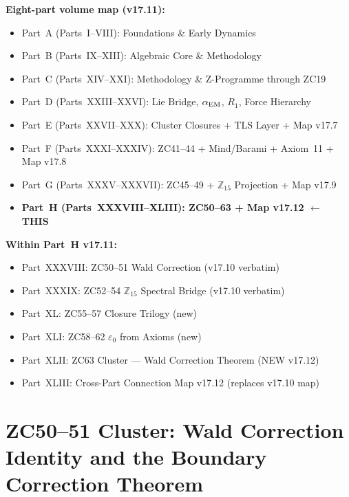 \documentclass[12pt, a4paper]{article}
\begin{document}
\begin{contentsbox}[title={Part H v17.11 --- Position in the Complete Edition}]
\textbf{Eight-part volume map (v17.11):}
\begin{itemize}[leftmargin=1.5em]
\item Part~A (Parts~I--VIII): Foundations \& Early Dynamics
\item Part~B (Parts~IX--XIII): Algebraic Core \& Methodology
\item Part~C (Parts~XIV--XXI): Methodology \& Z-Programme through ZC19
\item Part~D (Parts~XXIII--XXVI): Lie Bridge, $\alpha_{\rm EM}$, $R_1$, Force Hierarchy
\item Part~E (Parts~XXVII--XXX): Cluster Closures + TLS Layer + Map v17.7
\item Part~F (Parts~XXXI--XXXIV): ZC41--44 + Mind/Barami + Axiom~11 + Map v17.8
\item Part~G (Parts~XXXV--XXXVII): ZC45--49 + $\mathbb{Z}_{15}$ Projection + Map v17.9
\item \textbf{Part~H (Parts~XXXVIII--XLIII): ZC50--63 + Map v17.12 $\leftarrow$ THIS}
\end{itemize}

\medskip
\textbf{Within Part~H v17.11:}
\begin{itemize}[leftmargin=1.5em]
\item Part~XXXVIII: ZC50--51 Wald Correction (v17.10 verbatim)
\item Part~XXXIX: ZC52--54 $\mathbb{Z}_{15}$ Spectral Bridge (v17.10 verbatim)
\item Part~XL: ZC55--57 Closure Trilogy (new)
\item Part~XLI: ZC58--62 $\varepsilon_0$ from Axioms (new)
\item Part~XLII: ZC63 Cluster --- Wald Correction Theorem (NEW v17.12)
\item Part~XLIII: Cross-Part Connection Map v17.12 (replaces v17.10 map)
\end{itemize}
\end{contentsbox}

\clearpage
\part{ZC50--51 Cluster: Wald Correction Identity and the Boundary
  Correction Theorem}
\label{part:xxxviii}
\end{document}
